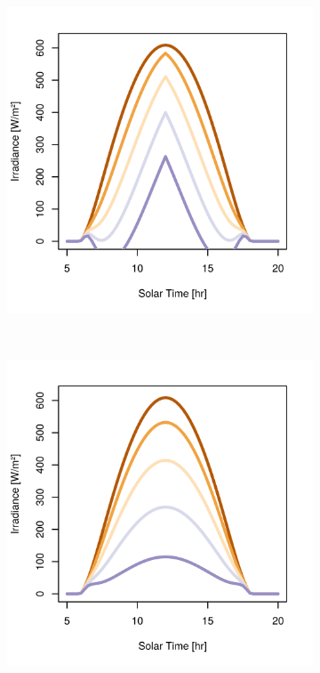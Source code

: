 \begin{figure}[h]
\begin{subfigure}[t]{\subfigureWidth}
  		\includegraphics[height=\graphicsHeight]{sections/martian-environment/plots/gi-variation-2-for-ls-248-phi-2-tau-05-gammac-90-and-albedo-027.png}
  		\label{fig:sub:irradiance-inclined-gamma-c-m90}
  	\end{subfigure}\\[0.8ex]
    \begin{subfigure}[t]{\subfigureWidth}
      \centering
  		\includegraphics[height=\graphicsHeight]{sections/martian-environment/plots/gi-variation-3-for-ls-248-phi-2-tau-05-gammac-180-and-albedo-027.png}

\end{subfigure}
\end{figure}
